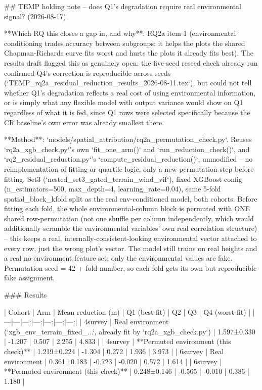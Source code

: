 ## TEMP holding note -- does Q1's degradation require real environmental signal? (2026-08-17)

**Which RQ this closes a gap in, and why**: RQ2a item 1 (environmental conditioning trades
accuracy between subgroups: it helps the plots the shared Chapman-Richards curve fits worst and
hurts the plots it already fits best). The results draft flagged this as genuinely open: the
five-seed reseed check already run confirmed Q4's correction is reproducible across seeds
(`TEMP_rq2a_residual_reduction_results_2026-08-11.tex`), but could not tell whether Q1's
degradation reflects a real cost of using environmental information, or is simply what any
flexible model with output variance would show on Q1 regardless of what it is fed, since Q1 rows
were selected specifically because the CR baseline's own error was already smallest there.

**Method**: `models/spatial_attribution/rq2a_permutation_check.py`. Reuses
`rq2a_xgb_check.py`'s own `fit_one_arm()` and `run_reduction_check()`, and
`rq2_residual_reduction.py`'s `compute_residual_reduction()`, unmodified -- no reimplementation of
fitting or quartile logic, only a new permutation step before fitting. Set3
(`nested_set3_gated_terrain_wind_vif`), fixed XGBoost config (n_estimators=500, max_depth=4,
learning_rate=0.04), same 5-fold spatial_block_kfold split as the real env-conditioned model, both
cohorts. Before fitting each fold, the whole environmental-column block is permuted with ONE
shared row-permutation (not one shuffle per column independently, which would additionally
scramble the environmental variables' own real correlation structure) -- this keeps a real,
internally-consistent-looking environmental vector attached to every row, just the wrong plot's
vector. The model still trains on real heights and a real no-environment feature set; only the
environmental values are fake. Permutation seed = 42 + fold number, so each fold gets its own but
reproducible fake assignment.

### Results

| Cohort | Arm | Mean reduction (m) | Q1 (best-fit) | Q2 | Q3 | Q4 (worst-fit) |
|---|---|---:|---:|---:|---:|---:|
| 4survey | Real environment (`xgb_env_terrain_fixed_...`, already fit by `rq2a_xgb_check.py`) | 1.597±0.330 | -1.207 | 0.507 | 2.255 | 4.833 |
| 4survey | **Permuted environment (this check)** | 1.219±0.224 | -1.304 | 0.272 | 1.936 | 3.973 |
| 6survey | Real environment | 0.361±0.183 | -0.723 | -0.020 | 0.572 | 1.614 |
| 6survey | **Permuted environment (this check)** | 0.248±0.146 | -0.565 | -0.010 | 0.386 | 1.180 |

